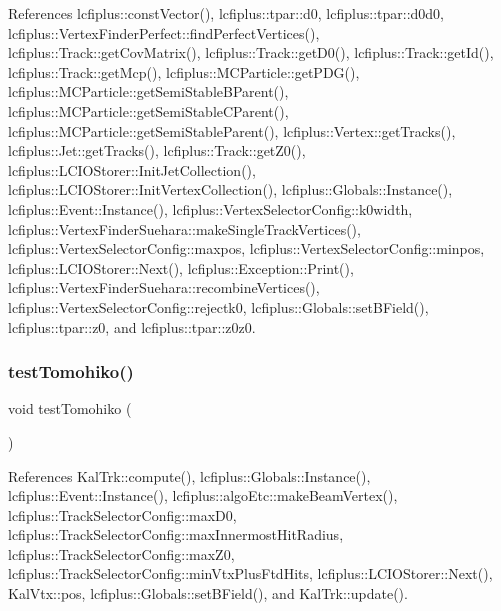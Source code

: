 References lcfiplus\+::const\+Vector(), lcfiplus\+::tpar\+::d0, lcfiplus\+::tpar\+::d0d0, lcfiplus\+::\+Vertex\+Finder\+Perfect\+::find\+Perfect\+Vertices(), lcfiplus\+::\+Track\+::get\+Cov\+Matrix(), lcfiplus\+::\+Track\+::get\+D0(), lcfiplus\+::\+Track\+::get\+Id(), lcfiplus\+::\+Track\+::get\+Mcp(), lcfiplus\+::\+M\+C\+Particle\+::get\+P\+D\+G(), lcfiplus\+::\+M\+C\+Particle\+::get\+Semi\+Stable\+B\+Parent(), lcfiplus\+::\+M\+C\+Particle\+::get\+Semi\+Stable\+C\+Parent(), lcfiplus\+::\+M\+C\+Particle\+::get\+Semi\+Stable\+Parent(), lcfiplus\+::\+Vertex\+::get\+Tracks(), lcfiplus\+::\+Jet\+::get\+Tracks(), lcfiplus\+::\+Track\+::get\+Z0(), lcfiplus\+::\+L\+C\+I\+O\+Storer\+::\+Init\+Jet\+Collection(), lcfiplus\+::\+L\+C\+I\+O\+Storer\+::\+Init\+Vertex\+Collection(), lcfiplus\+::\+Globals\+::\+Instance(), lcfiplus\+::\+Event\+::\+Instance(), lcfiplus\+::\+Vertex\+Selector\+Config\+::k0width, lcfiplus\+::\+Vertex\+Finder\+Suehara\+::make\+Single\+Track\+Vertices(), lcfiplus\+::\+Vertex\+Selector\+Config\+::maxpos, lcfiplus\+::\+Vertex\+Selector\+Config\+::minpos, lcfiplus\+::\+L\+C\+I\+O\+Storer\+::\+Next(), lcfiplus\+::\+Exception\+::\+Print(), lcfiplus\+::\+Vertex\+Finder\+Suehara\+::recombine\+Vertices(), lcfiplus\+::\+Vertex\+Selector\+Config\+::rejectk0, lcfiplus\+::\+Globals\+::set\+B\+Field(), lcfiplus\+::tpar\+::z0, and lcfiplus\+::tpar\+::z0z0.

\mbox{\label{Driver_8h_a5584b04f50c33cf378d710da731c1e59}} 
\subsubsection{test\+Tomohiko()}
{\footnotesize\ttfamily void test\+Tomohiko (\begin{DoxyParamCaption}{ }\end{DoxyParamCaption})}



References Kal\+Trk\+::compute(), lcfiplus\+::\+Globals\+::\+Instance(), lcfiplus\+::\+Event\+::\+Instance(), lcfiplus\+::algo\+Etc\+::make\+Beam\+Vertex(), lcfiplus\+::\+Track\+Selector\+Config\+::max\+D0, lcfiplus\+::\+Track\+Selector\+Config\+::max\+Innermost\+Hit\+Radius, lcfiplus\+::\+Track\+Selector\+Config\+::max\+Z0, lcfiplus\+::\+Track\+Selector\+Config\+::min\+Vtx\+Plus\+Ftd\+Hits, lcfiplus\+::\+L\+C\+I\+O\+Storer\+::\+Next(), Kal\+Vtx\+::pos, lcfiplus\+::\+Globals\+::set\+B\+Field(), and Kal\+Trk\+::update().

